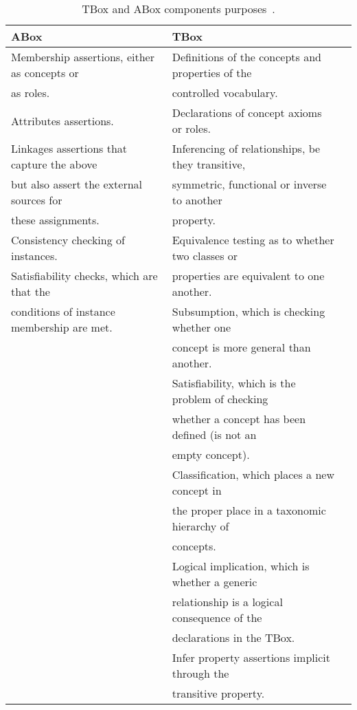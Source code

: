 \begin{table}[H]
 \caption{TBox and ABox components purposes~\citep{abox_tbox}.}
 \label{tbl:dl_terminology}
 \footnotesize
 \centering
\begin{tabular}{l l l}
  \hline 
  \textbf{ABox} 				&  \textbf{TBox} \\
  \hline 
  Membership assertions, either as concepts or  & Definitions of the concepts and properties of the 	\\
  as roles. 					& controlled vocabulary.				\\
  Attributes assertions. 			& Declarations of concept axioms or roles.		\\
  Linkages assertions that capture the above	& Inferencing of relationships, be they transitive, 	\\
  but also assert the external sources for 	& symmetric, functional or inverse to another 		\\
  these assignments. 				& property.						\\
  Consistency checking of instances.		& Equivalence testing as to whether two classes or 	\\
  Satisfiability checks, which are that the	& properties are equivalent to one another.		\\
  conditions of instance membership are met.	& Subsumption, which is checking whether one 		\\
						& concept is more general than another.			\\
						& Satisfiability, which is the problem of checking 	\\
						& whether a concept has been defined (is not an 	\\
						& empty concept).					\\
						& Classification, which places a new concept in  	\\
						& the proper place in a taxonomic hierarchy of 		\\
						& concepts.						\\
						& Logical implication, which is whether a generic 	\\
						& relationship is a logical consequence of the		\\ 
						& declarations in the TBox.				\\
						& Infer property assertions implicit through the 	\\
						& transitive property.					\\	
\hline
\end{tabular}
\end{table}